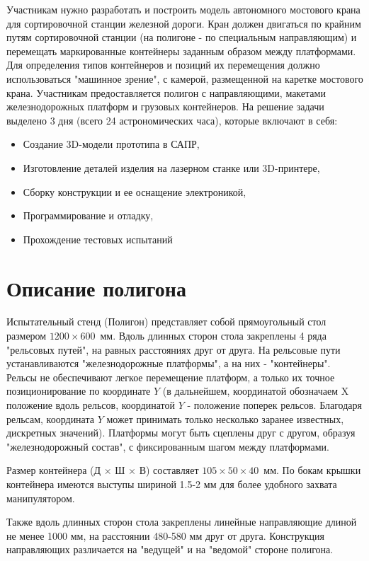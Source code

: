 Участникам нужно разработать и построить модель автономного мостового крана для сортировочной станции железной дороги. Кран должен двигаться по крайним путям сортировочной станции (на полигоне - по специальным направляющим) и перемещать маркированные контейнеры заданным образом между платформами.  Для определения типов контейнеров и позиций их перемещения должно использоваться "машинное зрение", с камерой, размещенной на каретке мостового крана.
Участникам предоставляется полигон с направляющими, макетами железнодорожных платформ и грузовых контейнеров. На решение задачи выделено 3 дня (всего 24 астрономических часа), которые включают в себя:
\begin{itemize}
    \item Создание 3D-модели прототипа в САПР, 
    \item Изготовление деталей изделия на лазерном станке или 3D-принтере, 
    \item Сборку конструкции и ее оснащение электроникой, 
    \item Программирование и отладку,
    \item Прохождение тестовых испытаний
\end{itemize}

\section{Описание полигона}

Испытательный стенд (Полигон) представляет собой прямоугольный стол размером $1200 \times 600$~мм. Вдоль длинных сторон стола закреплены 4 ряда "рельсовых путей", на равных расстояниях друг от друга.  На рельсовые пути устанавливаются "железнодорожные платформы", а на них - "контейнеры".  Рельсы не обеспечивают легкое перемещение платформ, а только их точное позиционирование по координате $Y$ (в дальнейшем, координатой обозначаем X положение вдоль рельсов, координатой $Y$ - положение поперек рельсов. Благодаря рельсам, координата $Y$ может принимать только несколько заранее известных, дискретных значений).  Платформы могут быть сцеплены друг с другом, образуя "железнодорожный состав", с фиксированным шагом между платформами.  

Размер контейнера (Д $\times$ Ш $\times$ В) составляет $105 \times 50 \times 40$~мм. По бокам крышки контейнера имеются выступы шириной 1.5-2 мм для более удобного захвата манипулятором. 

Также вдоль длинных сторон стола закреплены линейные направляющие длиной не менее 1000 мм, на расстоянии 480-580 мм друг от друга.  Конструкция направляющих различается на "ведущей" и на "ведомой" стороне полигона. 

